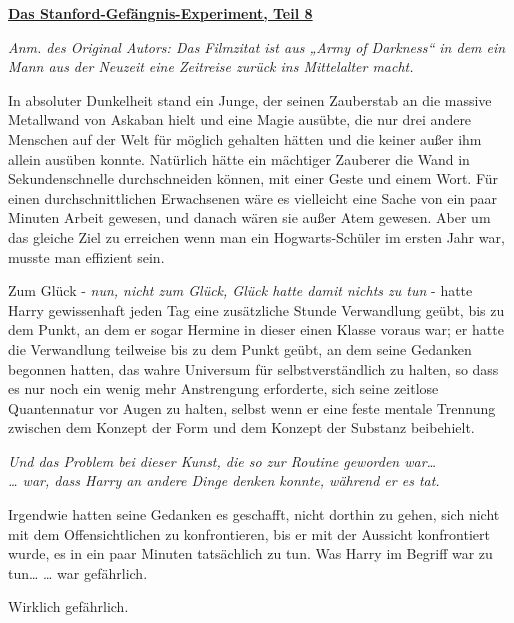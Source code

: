 

\hypertarget{das-stanford-gefuxe4ngnis-experiment-teil-8}{%

\textbf{\uline{Das Stanford-Gefängnis-Experiment, Teil 8}}

\emph{Anm. des Original Autors: Das Filmzitat ist aus „Army of Darkness“ in dem ein Mann aus der Neuzeit eine Zeitreise zurück ins Mittelalter macht.}

In absoluter Dunkelheit stand ein Junge, der seinen Zauberstab an die massive Metallwand von Askaban hielt und eine Magie ausübte, die nur drei andere Menschen auf der Welt für möglich gehalten hätten und die keiner außer ihm allein ausüben konnte. Natürlich hätte ein mächtiger Zauberer die Wand in Sekundenschnelle durchschneiden können, mit einer Geste und einem Wort. Für einen durchschnittlichen Erwachsenen wäre es vielleicht eine Sache von ein paar Minuten Arbeit gewesen, und danach wären sie außer Atem gewesen. Aber um das gleiche Ziel zu erreichen wenn man ein Hogwarts-Schüler im ersten Jahr war, musste man effizient sein.

Zum Glück - \emph{nun, nicht zum Glück, Glück hatte damit nichts zu tun} - hatte Harry gewissenhaft jeden Tag eine zusätzliche Stunde Verwandlung geübt, bis zu dem Punkt, an dem er sogar Hermine in dieser einen Klasse voraus war; er hatte die Verwandlung teilweise bis zu dem Punkt geübt, an dem seine Gedanken begonnen hatten, das wahre Universum für selbstverständlich zu halten, so dass es nur noch ein wenig mehr Anstrengung erforderte, sich seine zeitlose Quantennatur vor Augen zu halten, selbst wenn er eine feste mentale Trennung zwischen dem Konzept der Form und dem Konzept der Substanz beibehielt.

\emph{Und das Problem bei dieser Kunst, die so zur Routine geworden war…}\\ \emph{… war, dass Harry an andere Dinge denken konnte, während er es tat.}

Irgendwie hatten seine Gedanken es geschafft, nicht dorthin zu gehen, sich nicht mit dem Offensichtlichen zu konfrontieren, bis er mit der Aussicht konfrontiert wurde, es in ein paar Minuten tatsächlich zu tun. Was Harry im Begriff war zu tun… … war gefährlich.

Wirklich gefährlich.

}

